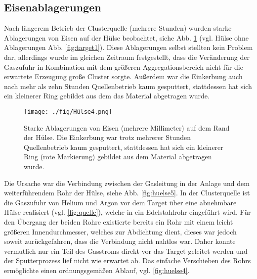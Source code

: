 \subsection{Eisenablagerungen}
Nach längerem Betrieb der Clusterquelle (mehrere Stunden) wurden starke Ablagerungen von Eisen auf der Hülse beobachtet, siehe Abb. \ref{fig:huelse} (vgl. Hülse ohne Ablagerungen Abb. \ref{fig:target1}).
Diese Ablagerungen selbst stellten kein Problem dar, allerdings wurde im gleichen Zeitraum festgestellt, dass die Veränderung der Gaszufuhr in Kombination mit dem größeren Aggregationsbereich nicht für die erwartete Erzeugung große Cluster sorgte.
Außerdem war die Einkerbung auch nach mehr als zehn Stunden Quellenbetrieb kaum gesputtert, stattdessen hat sich ein kleinerer Ring gebildet aus dem das Material abgetragen wurde.
\begin{figure}
  \centering
  \texttt{[image: ./fig/Hülse4.png]}
  \caption{Starke Ablagerungen von Eisen (mehrere Millimeter) auf dem Rand der Hülse. Die Einkerbung war trotz mehrerer Stunden Quellenbetrieb kaum gesputtert, stattdessen hat sich ein kleinerer Ring (rote Markierung) gebildet aus dem Material abgetragen wurde.}
  \label{fig:huelse}
\end{figure}
Die Ursache war die Verbindung zwischen der Gasleitung in der Anlage und dem weiterführendem Rohr der Hülse, siehe Abb. \ref{fig:huelse5}.
In der Clusterquelle ist die Gaszufuhr von Helium und Argon vor dem Target über eine abnehmbare Hülse realisiert (vgl. \ref{fig:quelle}), welche in ein Edelstahlrohr eingeführt wird.
Für den Übergang der beiden Rohre existierte bereits ein Rohr mit einem leicht größeren Innendurchmesser, welches zur Abdichtung dient, dieses war jedoch soweit zurückgefahren, dass die Verbindung nicht nahtlos war.
Daher konnte vermutlich nur ein Teil des Gasstroms direkt vor das Target geleitet werden und der Sputterprozess lief nicht wie erwartet ab.
Das einfache Verschieben des Rohrs ermöglichte einen ordnungsgemäßen Ablauf, vgl. \ref{fig:huelse4}.
